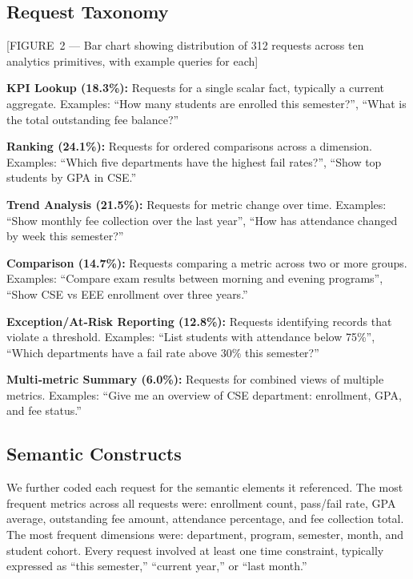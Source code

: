 \documentclass[11pt]{article}
\begin{document}
\subsection{Request Taxonomy}
[FIGURE 2 — Bar chart showing distribution of 312 requests across ten analytics primitives, with example queries for each]

\noindent\textbf{KPI Lookup (18.3\%):} Requests for a single scalar fact, typically a current aggregate. Examples: ``How many students are enrolled this semester?'', ``What is the total outstanding fee balance?''

\noindent\textbf{Ranking (24.1\%):} Requests for ordered comparisons across a dimension. Examples: ``Which five departments have the highest fail rates?'', ``Show top students by GPA in CSE.''

\noindent\textbf{Trend Analysis (21.5\%):} Requests for metric change over time. Examples: ``Show monthly fee collection over the last year'', ``How has attendance changed by week this semester?''

\noindent\textbf{Comparison (14.7\%):} Requests comparing a metric across two or more groups. Examples: ``Compare exam results between morning and evening programs'', ``Show CSE vs EEE enrollment over three years.''

\noindent\textbf{Exception/At‑Risk Reporting (12.8\%):} Requests identifying records that violate a threshold. Examples: ``List students with attendance below 75\%'', ``Which departments have a fail rate above 30\% this semester?''

\noindent\textbf{Multi‑metric Summary (6.0\%):} Requests for combined views of multiple metrics. Examples: ``Give me an overview of CSE department: enrollment, GPA, and fee status.''

\subsection{Semantic Constructs}
We further coded each request for the semantic elements it referenced. The most frequent metrics across all requests were: enrollment count, pass/fail rate, GPA average, outstanding fee amount, attendance percentage, and fee collection total. The most frequent dimensions were: department, program, semester, month, and student cohort. Every request involved at least one time constraint, typically expressed as ``this semester,'' ``current year,'' or ``last month.''
\end{document}
